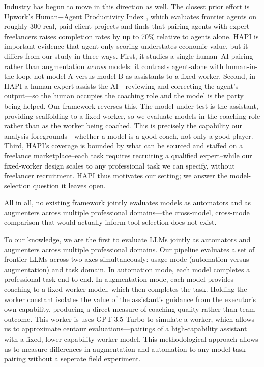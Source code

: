 Industry has begun to move in this direction as well. The closest prior effort is Upwork's Human+Agent Productivity Index \citep{upwork_hapi2025}, which evaluates frontier agents on roughly 300
real, paid client projects and finds that pairing agents with expert
freelancers raises completion rates by up to 70\% relative to agents
alone. HAPI is important evidence that agent-only scoring understates
economic value, but it differs from our study in three ways. First, it
studies a single human--AI pairing rather than augmentation
\emph{across} models: it contrasts agent-alone with human-in-the-loop,
not model A versus model B as assistants to a fixed worker. Second, in HAPI a human expert assists the AI—reviewing and correcting the agent's output—so the human occupies the coaching role and the model is the party being helped. Our framework reverses this. The model under test is the assistant, providing scaffolding to a fixed worker, so we evaluate models in the coaching role rather than as the worker being coached. This is precisely the capability our analysis foregrounds—whether a model is a good coach, not only a good player. Third, HAPI's coverage is bounded by what can be sourced and staffed on a freelance marketplace--each task requires recruiting a qualified expert--while our fixed-worker design scales to any professional task we can specify, without freelancer recruitment. HAPI thus motivates our setting; we answer the model-selection question it leaves open.

All in all, no existing framework jointly evaluates models as automators and as augmenters across multiple professional domains---the cross-model, cross-mode comparison that would actually inform tool selection does not exist.

To our knowledge, we are the first to evaluate LLMs jointly as automators and augmenters across multiple professional domains. Our pipeline evaluates a set of frontier LLMs across two axes simultaneously: usage mode (automation versus augmentation) and task domain. In automation mode, each model completes a professional task end-to-end. In augmentation mode, each model provides coaching to a fixed worker model, which then completes the task. Holding the worker constant isolates the value of the assistant's guidance from the executor's own capability, producing a direct measure of coaching quality rather than team outcome. This worker is uses GPT 3.5 Turbo to simulate a worker, which allows us to approximate centaur evaluations—pairings of a high-capability assistant with a fixed, lower-capability worker model. This methodological approach allows us to measure differences in augmentation and automation to any model-task pairing without a seperate field experiment.


